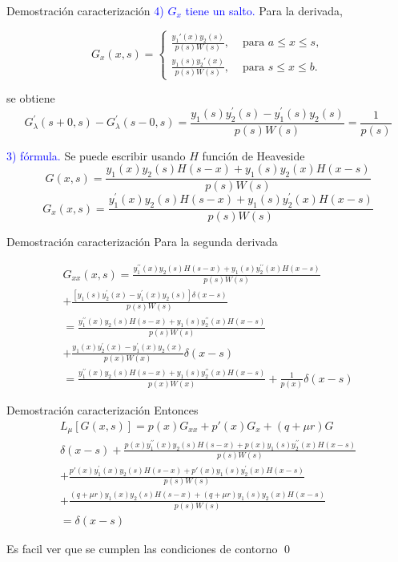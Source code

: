 \documentclass[xcolor=dvipsnames,a4paper,10pt,handout]{beamer}
\renewcommand{\emph}[1]{\textcolor{blue}{#1}}
\begin{document}
\begin{frame}{Demostración caracterización}
\emph{4) $G_x$ tiene un salto.}
Para la derivada,

$$
G_x(x, s)= \begin{cases}\frac{y_1'(x) y_2(s)}{p(s) W(s)}, & \text { para } a \leq x \leq s, \\ \frac{y_1(s) y_2'(x)}{p(s) W(s)}, & \text { para } s \leq x \leq b .\end{cases}
$$

se obtiene
$$
G_\lambda^{\prime}(s+0, s)-G_\lambda^{\prime}(s-0, s)=\frac{y_1(s) y_2^{\prime}(s)-y_1^{\prime}(s) y_2(s)}{p(s) W(s)}=\frac{1}{p(s)}
$$

\emph{3) fórmula.} Se puede escribir usando $H$ función de Heaveside
$$G(x,s)= \frac{y_1(x) y_2(s) H(s-x)+y_1(s) y_2(x) H(x-s)}{p(s) W(s)}$$
$$G_x(x,s)= \frac{y_1^{\prime}(x) y_2(s) H(s-x)+y_1(s) y_2^{\prime}(x) H(x-s)}{p(s) W(s)}$$



\end{frame}


\begin{frame}{Demostración caracterización}
Para la segunda derivada  
 
\begin{multline*}
G_{xx}(x, s)  =\frac{y_1^{\prime \prime}(x) y_2(s) H(s-x)+y_1(s) y_2^{\prime \prime}(x) H(x-s)}{p(s) W(s)} \\
+\frac{\left[y_1(s) y_2^{\prime}(x)-y_1^{\prime}(x) y_2(s)\right] \delta(x-s)}{p(s) W(s)} \\
 =\frac{y_1^{\prime \prime}(x) y_2(s) H(s-x)+y_1(s) y_2^{\prime \prime}(x) H(x-s)}{p(s) W(s)}\\
 +\frac{y_1(x) y_2^{\prime}(x)-y_1^{\prime}(x) y_2(x)}{p(x) W(x)} \delta(x-s) \\
 =\frac{y_1^{\prime \prime}(x) y_2(s) H(s-x)+y_1(s) y_2^{\prime \prime}(x) H(x-s)}{p(x) W(x)}+\frac{1}{p(x)} \delta(x-s)
\end{multline*}
 
\end{frame}


\begin{frame}{Demostración caracterización}
Entonces
\begin{multline*}
 L_\mu[G(x, s)]=p(x)G_{xx}+p'(x)G_x+(q+\mu r )G\\
 \delta(x-s)+\frac{p(x)y_1^{\prime \prime}(x) y_2(s) H(s-x)+p(x)y_1(s) y_2^{\prime \prime}(x) H(x-s)}{p(s)W(s)}\\
 +\frac{p'(x)y_1^{\prime}(x) y_2(s) H(s-x)+p'(x)y_1(s) y_2^{\prime}(x) H(x-s)}{p(s) W(s)}\\
 +\frac{(q+\mu r )y_1(x) y_2(s) H(s-x)+(q+\mu r )y_1(s) y_2(x) H(x-s)}{p(s) W(s)}\\
 = \delta(x-s)
 \end{multline*}
 
 
  
Es facil ver que  se cumplen las condiciones de contorno \qed

\end{frame}
\end{document}
